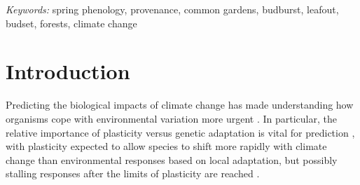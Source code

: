 \documentclass{article}
\begin{document}
\noindent \emph{Keywords:} spring phenology, provenance, common gardens, budburst,
leafout, budset, forests, climate change\\


\section{Introduction}


Predicting the biological impacts of climate change has made understanding how organisms cope with environmental variation more urgent \citep{botero15}. In particular, the relative importance of plasticity versus genetic adaptation is vital for prediction \citep{chevin10}, with plasticity expected to allow species to shift more rapidly with climate change than environmental responses based on local adaptation, but possibly stalling responses after the limits of plasticity are reached \citep{chevin102,snell18}.

\end{document}
